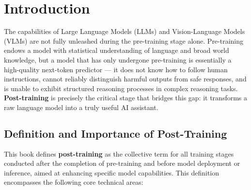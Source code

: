 \section*{Introduction}
\label{sec:t0}

The capabilities of Large Language Models (LLMs) and Vision-Language Models (VLMs)
are not fully unleashed during the pre-training stage alone.
Pre-training endows a model with statistical understanding of language and broad world knowledge,
but a model that has only undergone pre-training is essentially a high-quality next-token predictor ---
it does not know how to follow human instructions, cannot reliably distinguish harmful outputs from safe responses,
and is unable to exhibit structured reasoning processes in complex reasoning tasks.
\textbf{Post-training} is precisely the critical stage that bridges this gap:
it transforms a raw language model into a truly useful AI assistant.

\subsection{Definition and Importance of Post-Training}
\label{sec:t0-definition}

This book defines \textbf{post-training} as the collective term for all training stages
conducted after the completion of pre-training and before model deployment or inference,
aimed at enhancing specific model capabilities.
This definition encompasses the following core technical areas:

